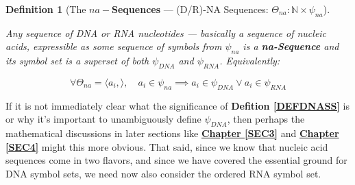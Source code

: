 \documentclass[a4paper, 18pt]{book} %
\newtheorem{defn}{Definition}
\begin{document}
\begin{defn}[The \textbf{$na-$Sequences} --- (D/R)-NA Sequences: $\Theta_{na}:\mathbb{N} \times \psi_{na}$]
\label{DEFNASEQ}

Any sequence of DNA or RNA nucleotides --- basically a sequence of nucleic acids, expressible as some sequence of symbols from $\psi_{na}$ is a \textbf{na-Sequence} and its symbol set is a superset of both $\psi_{DNA}$ and $\psi_{RNA}$. Equivalently:

\begin{equation}
\forall \Theta_{na} = \langle a_i, \rangle, \quad a_i \in \psi_{na} \implies a_i \in \psi_{DNA} \lor a_i \in \psi_{RNA}
\end{equation}

\end{defn}


If it is not immediately clear what the significance of \textbf{Defition \ref{DEFDNASS}} is or why it's important to unambiguously define $\psi_{DNA}$, then perhaps the mathematical discussions in later sections like \textbf{\hyperref[SEC3]{Chapter \ref{SEC3}}} and \textbf{\hyperref[SEC4]{Chapter \ref{SEC4}}} might this more obvious. That said, since we know that nucleic acid sequences come in two flavors\cite{wikipedia_nucleic_acid}, and since we have covered the essential ground for DNA symbol sets, we need now also consider the ordered RNA symbol set.\\
\end{document}
